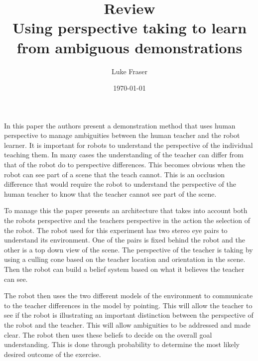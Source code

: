 \documentclass{article}
\begin{document}
\title{{\large Review} \\ Using perspective taking to learn from ambiguous demonstrations}
\author{Luke Fraser}
\date{\today}
\maketitle

\begingroup
\renewcommand{\section}[2]{}


\endgroup

\section*{Summary}
In this paper the authors present a demonstration method that uses human perspective to manage ambiguities between the human teacher and the robot learner. It is important for robots to understand the perspective of the individual teaching them. In many cases the understanding of the teacher can differ from that of the robot do to perspective differences. This becomes obvious when the robot can see part of a scene that the teach cannot. This is an occlusion difference that would require the robot to understand the perspective of the human teacher to know that the teacher cannot see part of the scene.

To manage this the paper presents an architecture that takes into account both the robots perspective and the teachers perspective in the action the selection of the robot. The robot used for this experiment has two stereo eye pairs to understand its environment. One of the pairs is fixed behind the robot and the other is a top down view of the scene. The perspective of the teacher is taking by using a culling cone based on the teacher location and orientation in the scene. Then the robot can build a belief system based on what it believes the teacher can see.

The robot then uses the two different models of the environment to communicate to the teacher differences in the model by pointing. This will allow the teacher to see if the robot is illustrating an important distinction between the perspective of the robot and the teacher. This will allow ambiguities to be addressed and made clear. The robot then uses these beliefs to decide on the overall goal understanding. This is done through probability to determine the most likely desired outcome of the exercise.
\end{document}

